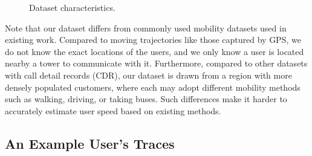 \begin{figure}[h]
  \centering
  \vspace{-0.1in}
  \caption{Dataset characteristics.}\label{fig:data_stat}
  \vspace{-0.1in}
\end{figure}

Note that our dataset differs from commonly used mobility datasets used in existing work.
Compared to moving trajectories like those captured by GPS,
we do not know the exact locations of the users, and we only know a user is located nearby a tower to communicate with it.
Furthermore, compared to other datasets with call detail records (CDR),
our dataset is drawn from a region with more densely populated customers, where each may adopt different mobility methods such as walking, driving, or taking buses.
Such differences make it harder to accurately estimate user speed based on existing methods. %

\subsection{An Example User's Traces}

